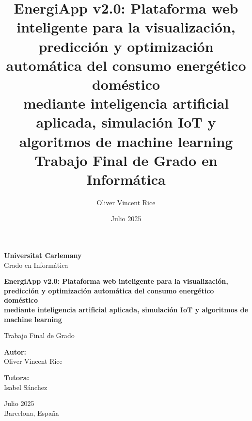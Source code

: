 \documentclass[12pt,a4paper,spanish]{book}
\title{
    \textbf{\Huge EnergiApp v2.0: Plataforma web inteligente para la visualización, predicción y optimización automática del consumo energético doméstico} \\
    \vspace{0.5cm}
    \textbf{\Large mediante inteligencia artificial aplicada, simulación IoT y algoritmos de machine learning} \\
    \vspace{1cm}
    \Large Trabajo Final de Grado en Informática
}
\author{Oliver Vincent Rice}
\date{Julio 2025}
\begin{document}
\begin{titlepage}
    \centering
    \vspace*{1cm}
    
    
    \vspace{1.5cm}
    
    {\huge\textbf{Universitat Carlemany}}\\
    \vspace{0.5cm}
    {\Large Grado en Informática}\\
    
    \vspace{2cm}
    
    {\Huge\textbf{EnergiApp v2.0: Plataforma web inteligente para la visualización, predicción y optimización automática del consumo energético doméstico}}\\
    \vspace{0.5cm}
    {\Large\textbf{mediante inteligencia artificial aplicada, simulación IoT y algoritmos de machine learning}}\\
    
    \vspace{1.5cm}
    
    {\Large Trabajo Final de Grado}\\
    
    \vspace{2cm}
    
    \begin{minipage}{0.45\textwidth}
        \begin{flushleft}
            \textbf{Autor:}\\
            Oliver Vincent Rice
        \end{flushleft}
    \end{minipage}
    \begin{minipage}{0.45\textwidth}
        \begin{flushright}
            \textbf{Tutora:}\\
            Isabel Sánchez
        \end{flushright}
    \end{minipage}
    
    \vfill
    
    {\large Julio 2025}\\
    {\large Barcelona, España}
    
\end{titlepage}
\end{document}
